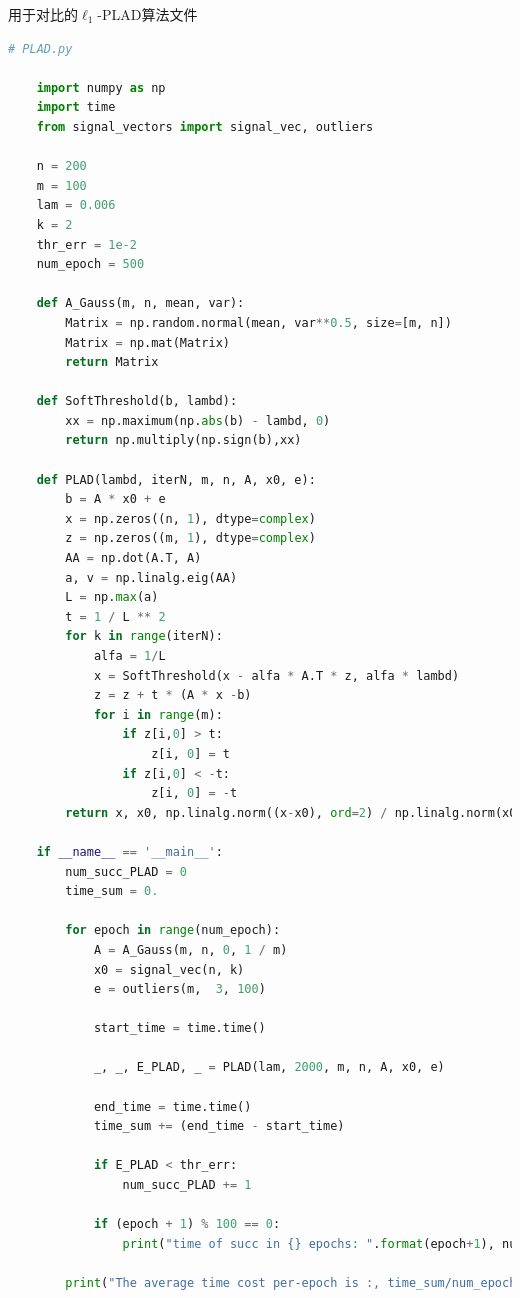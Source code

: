 \documentclass[AutoFakeBold]{LZUThesis}
\begin{document}
用于对比的$\ell_1$-PLAD算法文件

\begin{lstlisting}[language = python]
    # PLAD.py

    import numpy as np
    import time
    from signal_vectors import signal_vec, outliers

    n = 200
    m = 100
    lam = 0.006
    k = 2
    thr_err = 1e-2
    num_epoch = 500

    def A_Gauss(m, n, mean, var):
        Matrix = np.random.normal(mean, var**0.5, size=[m, n])
        Matrix = np.mat(Matrix)
        return Matrix

    def SoftThreshold(b, lambd):
        xx = np.maximum(np.abs(b) - lambd, 0)
        return np.multiply(np.sign(b),xx)

    def PLAD(lambd, iterN, m, n, A, x0, e):
        b = A * x0 + e
        x = np.zeros((n, 1), dtype=complex)
        z = np.zeros((m, 1), dtype=complex)
        AA = np.dot(A.T, A)
        a, v = np.linalg.eig(AA)
        L = np.max(a)
        t = 1 / L ** 2
        for k in range(iterN):
            alfa = 1/L
            x = SoftThreshold(x - alfa * A.T * z, alfa * lambd)
            z = z + t * (A * x -b)
            for i in range(m):
                if z[i,0] > t:
                    z[i, 0] = t
                if z[i,0] < -t:
                    z[i, 0] = -t
        return x, x0, np.linalg.norm((x-x0), ord=2) / np.linalg.norm(x0, ord=2), max(np.abs(A.T*e))

    if __name__ == '__main__':
        num_succ_PLAD = 0
        time_sum = 0.

        for epoch in range(num_epoch):
            A = A_Gauss(m, n, 0, 1 / m)
            x0 = signal_vec(n, k)
            e = outliers(m,  3, 100)

            start_time = time.time()

            _, _, E_PLAD, _ = PLAD(lam, 2000, m, n, A, x0, e)

            end_time = time.time()
            time_sum += (end_time - start_time)

            if E_PLAD < thr_err:
                num_succ_PLAD += 1

            if (epoch + 1) % 100 == 0:
                print("time of succ in {} epochs: ".format(epoch+1), num_succ_PLAD)

        print("The average time cost per-epoch is :, time_sum/num_epoch)
\end{lstlisting}
\end{document}
